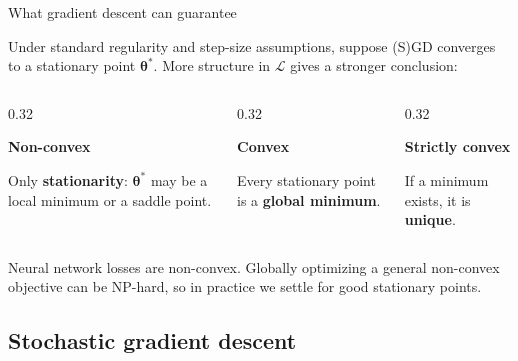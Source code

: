 \documentclass[11pt,aspectratio=169]{beamer}
\begin{document}
\begin{frame}{What gradient descent can guarantee}
	\setlength{\parskip}{4pt}

	Under standard regularity and step-size assumptions, suppose (S)GD converges to a stationary point $\boldsymbol{\theta}^*$. More structure in $\mathcal{L}$ gives a stronger conclusion:

	\begin{columns}[T,onlytextwidth]
		\begin{column}{0.32\textwidth}
			\begin{tcolorbox}[nndsorange,courseheight={opt-guarantees}{}]
				\textbf{Non-convex}

				Only \textbf{stationarity}: $\boldsymbol{\theta}^*$ may be a local minimum or a saddle point.
			\end{tcolorbox}
		\end{column}
		\begin{column}{0.32\textwidth}
			\begin{tcolorbox}[nndsblue,courseheight={opt-guarantees}{}]
				\textbf{Convex}

				Every stationary point is a \textbf{global minimum}.
			\end{tcolorbox}
		\end{column}
		\begin{column}{0.32\textwidth}
			\begin{tcolorbox}[nndsgreen,courseheight={opt-guarantees}{}]
				\textbf{Strictly convex}

				If a minimum exists, it is \textbf{unique}.
			\end{tcolorbox}
		\end{column}
	\end{columns}

	\medskip
	Neural network losses are non-convex. Globally optimizing a general non-convex objective can be NP-hard, so in practice we settle for good stationary points.

\end{frame}

\subsection{Stochastic gradient descent}
\end{document}
